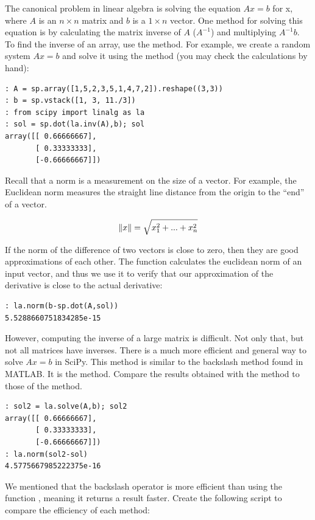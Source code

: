 The canonical problem in linear algebra is solving the equation $Ax = b$ for x,
where $A$ is an $n \times n$ matrix and $b$ is a  $1 \times n$ vector.  One method for solving this equation is by calculating the matrix inverse of $A$ ($A^{-1}$) and multiplying $A^{-1}b$.  To find the inverse of an array, use the  method.
For example, we create a random system $Ax =b$ and solve it using the  method (you may check the calculations by hand):

\begin{lstlisting}
: A = sp.array([1,5,2,3,5,1,4,7,2]).reshape((3,3))
: b = sp.vstack([1, 3, 11./3])
: from scipy import linalg as la
: sol = sp.dot(la.inv(A),b); sol
array([[ 0.66666667],
       [ 0.33333333],
       [-0.66666667]])
\end{lstlisting}

Recall that a norm is a measurement on the size of a vector.  For example, the
Euclidean norm measures the straight line distance from the origin to the
``end'' of a vector.

\[
\lVert x\rVert = \sqrt{x_1^2 + ... + x_n^2}
\]

If the norm of the difference of two vectors is close to zero, then they are
good approximations of each other.  The  function calculates the
euclidean norm of an input vector, and thus we use it to verify that our
approximation of the derivative is close to the actual derivative:
\begin{lstlisting}
: la.norm(b-sp.dot(A,sol))
5.5288660751834285e-15
\end{lstlisting}

However, computing the inverse of a large matrix is difficult.  Not only that, but not all matrices have inverses.  There is a much more efficient and general way to solve $Ax=b$ in SciPy.  This method is similar to the backslash method found in MATLAB.  It is the  method. Compare the results obtained with the  method to those of the  method.
\begin{lstlisting}
: sol2 = la.solve(A,b); sol2
array([[ 0.66666667],
       [ 0.33333333],
       [-0.66666667]])
: la.norm(sol2-sol)
4.5775667985222375e-16
\end{lstlisting}

We mentioned that the backslash operator is more efficient than using the
function , meaning it returns a result faster. Create the following script to compare the efficiency of each method:

